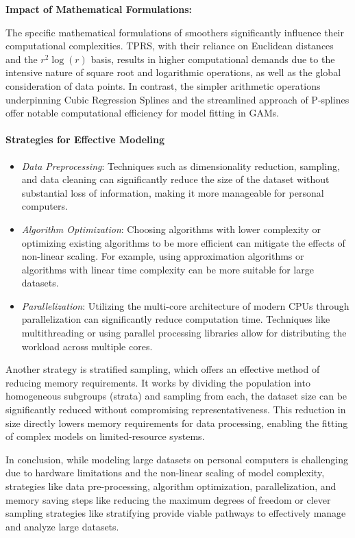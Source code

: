 \documentclass[12pt, twoside,hidelinks]{article}
\theoremstyle{definition}
\numberwithin{equation}{section}
\begin{document}
\textbf{Impact of Mathematical Formulations:}

The specific mathematical formulations of smoothers significantly influence their computational complexities. TPRS, with their reliance on Euclidean distances and the $r^2 \log(r)$ basis, results in higher computational demands due to the intensive nature of square root and logarithmic operations, as well as the global consideration of data points. In contrast, the simpler arithmetic operations underpinning Cubic Regression Splines and the streamlined approach of P-splines offer notable computational efficiency for model fitting in GAMs.


\paragraph{Strategies for Effective Modeling}

\begin{itemize}
     \item \textit{Data Preprocessing}: Techniques such as dimensionality reduction, sampling, and data cleaning can significantly reduce the size of the dataset without substantial loss of information, making it more manageable for personal computers.
    \item \textit{Algorithm Optimization}: Choosing algorithms with lower complexity or optimizing existing algorithms to be more efficient can mitigate the effects of non-linear scaling. For example, using approximation algorithms or algorithms with linear time complexity can be more suitable for large datasets.
    \item \textit{Parallelization}: Utilizing the multi-core architecture of modern CPUs through parallelization can significantly reduce computation time. Techniques like multithreading or using parallel processing libraries allow for distributing the workload across multiple cores.
\end{itemize}

Another strategy is stratified sampling, which offers an effective method of reducing memory requirements. It works by dividing the population into homogeneous subgroups (strata) and sampling from each, the dataset size can be significantly reduced without compromising representativeness. This reduction in size directly lowers memory requirements for data processing, enabling the fitting of complex models on limited-resource systems.
\newline

In conclusion, while modeling large datasets on personal computers is challenging due to hardware limitations and the non-linear scaling of model complexity, strategies like data pre-processing, algorithm optimization, parallelization, and memory saving steps like reducing the maximum degrees of freedom or clever sampling strategies like stratifying provide viable pathways to effectively manage and analyze large datasets.
\end{document}
